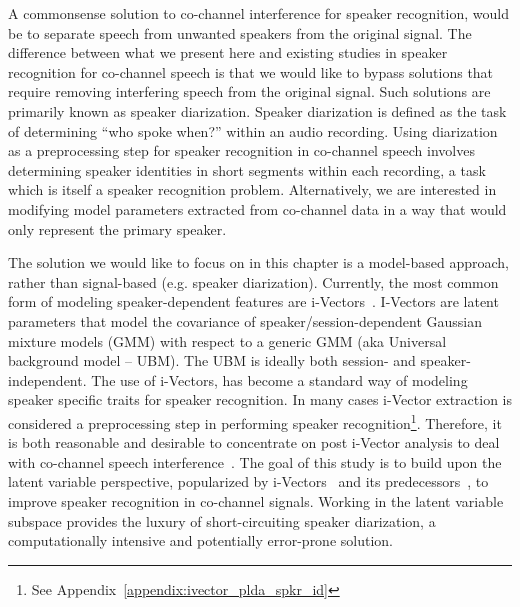 A commonsense solution to co-channel interference for speaker recognition, would be to separate speech from unwanted speakers from the original signal. 
The difference between what we present here and existing studies in speaker recognition for co-channel speech is that we would like to bypass solutions that require removing interfering speech from the original signal. 
Such solutions are primarily known as speaker diarization. 
Speaker diarization is defined as the task of determining ``who spoke when?'' within an audio recording. 
Using diarization as a preprocessing step for speaker recognition in co-channel speech involves determining speaker identities in short segments within each recording, a task which is itself a speaker recognition problem.  
Alternatively, we are interested in modifying model parameters extracted from co-channel data in a way that would only represent the primary speaker. 

The solution we would like to focus on in this chapter is a model-based approach, rather than signal-based (e.g. speaker diarization). 
Currently, the most common form of modeling speaker-dependent features are i-Vectors~\cite{dehak2011front}. 
I-Vectors are latent parameters that model the covariance of speaker/session-dependent Gaussian mixture models (GMM) with respect to a generic GMM (aka Universal background model -- UBM).  
The UBM is ideally both session- and speaker-independent. 
The use of i-Vectors, has become a standard way of modeling speaker specific traits for speaker recognition. 
In many cases i-Vector extraction is considered a preprocessing step in performing speaker recognition\footnote{See Appendix~\ref{appendix:ivector_plda_spkr_id}}. 
Therefore, it is both reasonable and desirable to concentrate on post i-Vector analysis to deal with co-channel speech interference~\cite{ivector_challenge}. 
The goal of this study is to build upon the latent variable perspective, popularized by i-Vectors~\cite{dehak2011front} and its predecessors~\cite{kenny2010bayesian}, to improve speaker recognition in co-channel signals. 
Working in the latent variable subspace provides the luxury of short-circuiting speaker diarization, a computationally intensive and potentially error-prone solution. 

